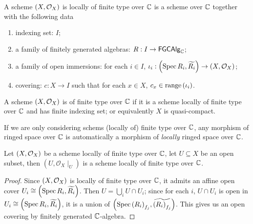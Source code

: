 \begin{definition}
  A scheme $\left(X, \mathcal{O}_{X}\right)$ is locally of finite type over $\mathbb{C}$ is a scheme over $\mathbb{C}$ together
  with the following data
    \begin{enumerate}
        \item indexing set: $I$;
        \item a family of finitely generated algebras: $R : I \to \mathsf{FGCAlg}_{\mathbb{C}}$;
        \item a family of open immersions: for each $i \in I$, $\iota_i: \left(\operatorname*{Spec}{R_i}, \widetilde{R_i}\right) \to \left(X, \mathcal{O}_{X}\right)$;
        \item covering: $c : X \to I$ such that for each $x \in X$, $c_x \in \operatorname*{range}\left({\iota_i}\right)$.
    \end{enumerate}
\end{definition}

\begin{definition}\label{def:SchemeOfFiniteType}
  A scheme $\left(X, \mathcal{O}_{X}\right)$ is of finite type over $\mathbb{C}$ if it is a scheme locally of finite type over $\mathbb{C}$
  and has finite indexing set; or equivalently $X$ is quasi-compact.
\end{definition}

\begin{remark}
  If we are only considering schems (locally of) finite type over $\mathbb{C}$, any morphism of ringed space over $\mathbb{C}$ is automatically a morphism of {\em locally\/} ringed space over $\mathbb{C}$.

\end{remark}

\begin{proposition}
  Let $\left(X, \mathcal{O}_{X}\right)$ be a scheme locally of finite type over $\mathbb{C}$, let $U \subseteq X$ be an open subset, then $(U, \mathcal{O}_{X}\mid_{U})$ is a scheme locally of finite type over $\mathbb{C}$.
  \label{thm:restriction-of-scheme-of-finite-type-is-scheme-of-finite-type}
\end{proposition}
\begin{proof}
  Since $\left(X, \mathcal{O}_{X}\right)$ is locally of finite type over $\mathbb{C}$, it admits an affine open cover $U_{i}\cong\left(\operatorname*{Spec}{R_{i}}, \widetilde{R_{i}}\right)$.
  Then $U = \bigcup_{i} U \cap U_{i}$; since for each $i$, $U \cap U_{i}$ is open in $U_{i} \cong \left(\operatorname*{Spec}{R_{i}}, \widetilde{R_{i}}\right)$, it is a union of $\left(\operatorname*{Spec}{{\left(R_{i}\right)}_{f_{j}}}, \widetilde{{\left(R_{i}\right)}_{f_{j}}}\right)$. This gives us an open covering by finitely generated $\mathbb{C}$-algebra.
\end{proof}


